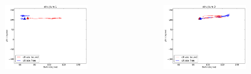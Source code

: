 \documentclass[english]{beamer}
\begin{document}
\begin{frame}
    \begin{columns}[t]
        \vspace{-4ex}
        \begin{figure}
            \includegraphics[width=0.85\textwidth]{figures/Complex_trajectory/collecitve_coords_structure1.pdf}  
        \end{figure}      
        \vspace{-5ex}
        \begin{figure}
            \includegraphics[width=0.85\textwidth]{figures/Complex_trajectory/collecitve_coords_structure3.pdf}  
        \end{figure}       


\end{columns}
\end{frame}
\end{document}
